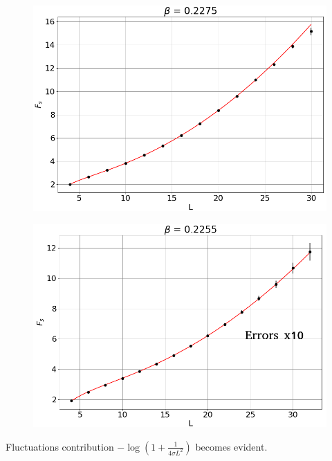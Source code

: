 \documentclass[12pt,handout]{beamer}
\begin{document}
\begin{frame}
\begin{center}
\begin{figure}[!htb]
\centering
\includegraphics[scale=0.4, center]{02275.png}
\end{figure}
\end{center}
\end{frame}

\begin{frame}
\begin{center}
\begin{figure}[!htb]
\centering
\includegraphics[scale=0.4, center]{0225.png}
\end{figure}
Fluctuations contribution $- \log \left( 1 + \frac{1}{4 \sigma L^2} \right)$ becomes evident.
\end{center}
\end{frame}
\end{document}
